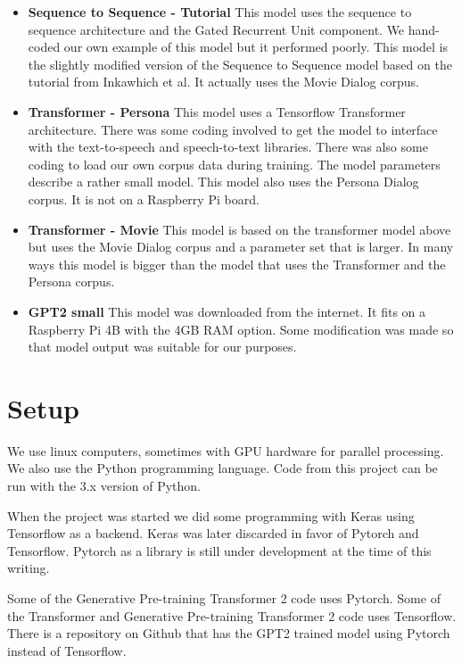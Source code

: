 \begin{itemize}
	\item \textbf{Sequence to Sequence - Tutorial} This model uses the sequence to sequence architecture and the Gated Recurrent Unit component. We hand-coded our own example of this model but it performed poorly. This model is the slightly modified version of the Sequence to Sequence model based on the tutorial from Inkawhich et al\cite{2018Inkawhich}. It actually uses the Movie Dialog corpus. 
	\item \textbf{Transformer - Persona} This model uses a Tensorflow Transformer architecture. There was some coding involved to get the model to interface with the text-to-speech and speech-to-text libraries. There was also some coding to load our own corpus data during training. The model parameters describe a rather small model. This model also uses the Persona Dialog corpus. It is not on a Raspberry Pi board.
	\item \textbf{Transformer - Movie} This model is based on the transformer model above but uses the Movie Dialog corpus and a parameter set that is larger. In many ways this model is bigger than the model that uses the Transformer and the Persona corpus.
	\item \textbf{GPT2 small} This model was downloaded from the internet. It fits on a Raspberry Pi 4B with the 4GB RAM option. Some modification was made so that model output was suitable for our purposes.
\end{itemize}



\section{Setup}

We use linux computers, sometimes with \ac{GPU} hardware for parallel processing. We also use the Python programming language. Code from this project can be run with the 3.x version of Python.

When the project was started we did some programming with Keras using Tensorflow as a backend. Keras was later discarded in favor of Pytorch and Tensorflow. Pytorch as a library is still under development at the time of this writing.

Some of the Generative Pre-training Transformer 2 code uses Pytorch. Some of the Transformer and Generative Pre-training Transformer 2 code uses Tensorflow. There is a repository on Github that has the GPT2 trained model using Pytorch instead of Tensorflow.

